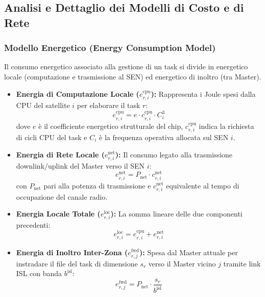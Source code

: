 \documentclass[12pt]{article}
\begin{document}
\subsection{Analisi e Dettaglio dei Modelli di Costo e di Rete}


\subsubsection{Modello Energetico (Energy Consumption Model)}
Il consumo energetico associato alla gestione di un task si divide in energetico locale (computazione e trasmissione al SEN) ed energetico di inoltro (tra Master).
\begin{itemize}
    \item \textbf{Energia di Computazione Locale ($e_{r,i}^{\text{cpu}}$):} Rappresenta i Joule spesi dalla CPU del satellite $i$ per elaborare il task $r$:
    \begin{equation}
    e_{r,i}^{\text{cpu}} = e \cdot c_{r,i}^{\text{cpu}} \cdot C_i^3
    \end{equation}
    dove $e$ \`e il coefficiente energetico strutturale del chip, $c_{r,i}^{\text{cpu}}$ indica la richiesta di cicli CPU del task e $C_i$ \`e la frequenza operativa allocata sul SEN $i$.
    
    \item \textbf{Energia di Rete Locale ($e_{r,i}^{\text{net}}$):} Il consumo legato alla trasmissione downlink/uplink del Master verso il SEN $i$:
    \begin{equation}
    e_{r,i}^{\text{net}} = P_{\text{net}} \cdot c_{r,i}^{\text{net}}
    \end{equation}
    con $P_{\text{net}}$ pari alla potenza di trasmissione e $c_{r,i}^{\text{net}}$ equivalente al tempo di occupazione del canale radio.
    
    \item \textbf{Energia Locale Totale ($e_{r,i}^{\text{loc}}$):} La somma lineare delle due componenti precedenti:
    \begin{equation}
    e_{r,i}^{\text{loc}} = e_{r,i}^{\text{cpu}} + e_{r,i}^{\text{net}}
    \end{equation}
    
    \item \textbf{Energia di Inoltro Inter-Zona ($e_{r,j}^{\text{fwd}}$):} Spesa dal Master attuale per instradare il file del task di dimensione $s_r$ verso il Master vicino $j$ tramite link ISL con banda $b^{\text{isl}}$:
    \begin{equation}
    e_{r,j}^{\text{fwd}} = P_{\text{net}} \cdot \frac{s_r}{b^{\text{isl}}}
    \end{equation}
\end{itemize}
\end{document}
